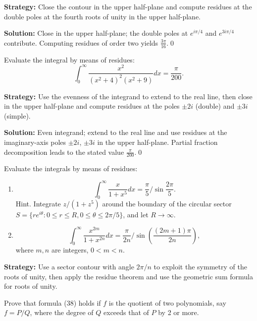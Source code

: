 \noindent\textbf{Strategy:} Close the contour in the upper half-plane and compute residues at the double poles at the fourth roots of unity in the upper half-plane.

\bigskip\noindent\textbf{Solution:}
Close in the upper half-plane; the double poles at $e^{i\pi/4}$ and $e^{3i\pi/4}$ contribute. Computing residues of order two yields $\frac{3\pi}{16}$.\qed


\begin{problembox}
Evaluate the integral by means of residues:
\[ \int_0^{\infty} \frac{x^2}{(x^2 + 4)^2 (x^2 + 9)} dx = \frac{\pi}{200}. \]
\end{problembox}

\noindent\textbf{Strategy:} Use the evenness of the integrand to extend to the real line, then close in the upper half-plane and compute residues at the poles \( \pm 2i \) (double) and \( \pm 3i \) (simple).

\bigskip\noindent\textbf{Solution:}
Even integrand; extend to the real line and use residues at the imaginary-axis poles $\pm2i$, $\pm3i$ in the upper half-plane. Partial fraction decomposition leads to the stated value $\frac{\pi}{200}$.\qed


\begin{problembox}
Evaluate the integrals by means of residues:
\begin{enumerate}[label=(\alph*)]
\item \[ \int_0^{\infty} \frac{x}{1 + x^5} dx = \frac{\pi}{5} / \sin \frac{2\pi}{5}. \]
Hint. Integrate \( z / (1 + z^5) \) around the boundary of the circular sector \( S = \{ r e^{i\theta} : 0 \leq r \leq R, 0 \leq \theta \leq 2\pi / 5 \} \), and let \( R \to \infty \).
\item \[ \int_0^{\infty} \frac{x^{2m}}{1 + x^{2n}} dx = \frac{\pi}{2n}/ \sin \left( \frac{(2m + 1) \pi}{2n} \right), \]
where \( m, n \) are integers, \( 0 < m < n \).
\end{enumerate}
\end{problembox}

\noindent\textbf{Strategy:} Use a sector contour with angle \( 2\pi/n \) to exploit the symmetry of the roots of unity, then apply the residue theorem and use the geometric sum formula for roots of unity.

\begin{problembox}
Prove that formula (38) holds if \( f \) is the quotient of two polynomials, say \( f = P/Q \), where the degree of \( Q \) exceeds that of \( P \) by 2 or more.
\end{problembox}

